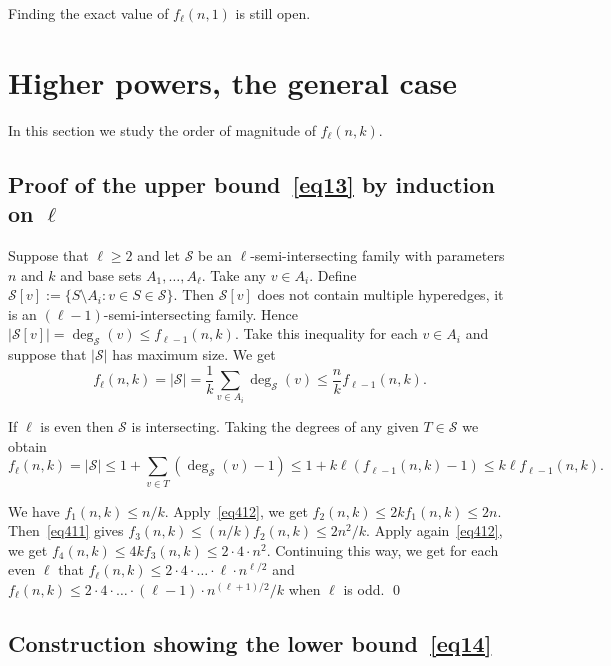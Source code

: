 \documentclass[12pt,a4paper]{amsart}
\numberwithin{equation}{section}
\theoremstyle{plain}
\theoremstyle{definition}
\newcommand{\m}{\mathcal}
\newcommand{\NN}{n}
\def\cS{{\mathcal{S}}}
\begin{document}
Finding the exact value of $f_\ell (\NN,1)$ is still open.



\section{Higher powers, the general case} \label{sec_generalpowers}


In this section we study the order of magnitude of $f_\ell(\NN,k)$.

\subsection{Proof of the upper bound~\eqref{eq13} by induction on $\ell$}\label{ss41}

Suppose that $\ell\geq 2$ and let $\cS$ be
an $\ell$-semi-intersecting family with parameters $\NN$ and $k$ and base sets $A_1, \dots, A_\ell$. Take any $v \in A_i$. Define
    $\m{S}[v]:=\{S\setminus A_i:  v\in S\in \m{S} \}$.
Then $\m{S}[v]$ does not contain multiple hyperedges, it is an $(\ell-1)$-semi-intersecting family.
Hence $|\m{S}[v]|= \deg_{\cS}(v) \leq f_{\ell-1}(\NN,k)$.
Take this inequality for each $v\in A_i$ and suppose that $|\cS|$ has maximum size. We get
\begin{equation}\label{eq411}
  f_\ell(\NN,k)=|\m{S}| = \frac{1}{k} \sum_{v\in A_i} \deg_{\m{S}}(v)   \leq   \frac{\NN}{k}  f_{\ell-1}(\NN,k).
\end{equation}

If $\ell$ is even then $\cS$ is intersecting. Taking the degrees of any given $T\in \m{S}$ we obtain
\begin{equation}\label{eq412}
  f_\ell(\NN,k)=|\m{S}| \leq 1 +\sum_{v\in T}(\deg_\m{S}(v)-1) \leq  1+k\ell\left(f_{\ell-1}(\NN,k)-1\right)\leq k\ell f_{\ell-1}(\NN,k).
\end{equation}

We have $f_1(\NN,k)\leq \NN/k$.
Apply~\eqref{eq412}, we get $ f_2(\NN,k) \leq 2k f_{1}(\NN,k)\leq 2\NN $.
Then~\eqref{eq411} gives $ f_3(\NN,k) \leq (\NN/k) f_{2}(\NN,k)\leq 2\NN^2/k $.
Apply again~\eqref{eq412}, we get $ f_4(\NN,k) \leq 4k f_{3}(\NN,k)\leq 2\cdot 4 \cdot \NN^2$.
Continuing this way, we get for each even $\ell$ that $ f_\ell(\NN,k) \leq  2\cdot4\cdot \dots \cdot \ell \cdot \NN^{\ell/2}$ and
 $ f_\ell(\NN,k) \leq  2\cdot4\cdot \dots \cdot (\ell-1) \cdot \NN^{(\ell+1)/2}/k$
when  $\ell$ is odd.
\qed


\subsection{Construction showing the lower bound~\eqref{eq14}}\label{ss42}
\end{document}
